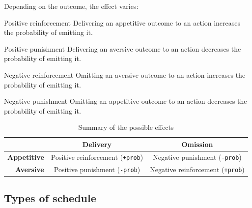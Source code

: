 Depending on the outcome, the effect varies:
\begin{descriptionlist}
    \item[Positive reinforcement] 
        Delivering an appetitive outcome to an action increases the probability of emitting it.

    \item[Positive punishment] 
        Delivering an aversive outcome to an action decreases the probability of emitting it.
    
    \item[Negative reinforcement] 
        Omitting an aversive outcome to an action increases the probability of emitting it.
    
    \item[Negative punishment] 
        Omitting an appetitive outcome to an action decreases the probability of emitting it.
\end{descriptionlist}

\begin{table}[H]
    \centering
    \begin{tabular}{r|cc}
        \toprule
                            & \textbf{Delivery}                         & \textbf{Omission} \\
        \midrule
        \textbf{Appetitive} & Positive reinforcement (\texttt{+prob})   & Negative punishment (\texttt{-prob}) \\
        \textbf{Aversive}   & Positive punishment (\texttt{-prob})      & Negative reinforcement (\texttt{+prob}) \\
        \bottomrule
    \end{tabular}
    \caption{Summary of the possible effects}
\end{table}


\subsection{Types of schedule}

